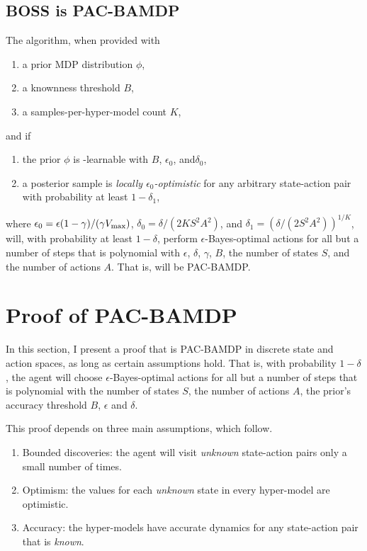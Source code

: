 \subsection{BOSS is PAC-BAMDP}
\label{sec:boss:pac-bamdp:provisions}

\begin{thm}
\label{sec:boss:thm:pac-bamdp}
The  algorithm, when provided with
\begin{enumerate}
\item a prior MDP distribution $\phi$,
\item a knownness threshold $B$,
\item a samples-per-hyper-model count $K$,
\end{enumerate}
and if
\begin{enumerate}
\item
\label{sec:boss:pac-bamdp:cond-bed}
the prior $\phi$ is \bed-learnable with $B$, $\epsilon_0$, and$\delta_0$,
\item 
\label{sec:boss:pac-bamdp:cond-local-opt}
a posterior sample is \emph{locally $\epsilon_0$-optimistic} for any arbitrary state-action pair with probability at least $1-\delta_1$,
\end{enumerate}
where $\epsilon_0 = \epsilon(1-\gamma)/(\gamma V_{\rm max})$, $\delta_0 = \delta/(2KS^2A^2)$, and $\delta_1 = \left(\delta/(2S^2A^2)\right)^{1/K}$,
will, with probability at least $1-\delta$, perform $\epsilon$-Bayes-optimal actions for all but a number of steps that is polynomial with $\epsilon$, $\delta$, $\gamma$, $B$, the number of states $S$, and the number of actions $A$. That is,  will be PAC-BAMDP.
\end{thm}

\section{Proof of PAC-BAMDP}
\label{sec:boss:pac-bamdp}

In this section, I present a proof that  is PAC-BAMDP in discrete state and action spaces, as long as certain assumptions hold. That is, with probability $1-\delta$, the agent will choose $\epsilon$-Bayes-optimal actions for all but a number of steps that is polynomial with the number of states $S$, the number of actions $A$, the prior's accuracy threshold $B$, $\epsilon$ and $\delta$.

This proof depends on three main assumptions, which follow.
\begin{enumerate}
\item
\label{boss:alg:disc:proof:cond:disc}
Bounded discoveries: the agent will visit \emph{unknown} state-action pairs only a small number of times.
\item
\label{boss:alg:disc:proof:cond:opt}
Optimism: the values for each \emph{unknown} state in every hyper-model are optimistic.
\item
\label{boss:alg:disc:proof:cond:acc}
Accuracy: the hyper-models have accurate dynamics for any state-action pair that is \emph{known}.
\end{enumerate}

